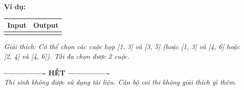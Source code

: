 \documentclass[11pt, a4paper]{article}
\newcommand{\iobox}[2]{
    \begin{center}
    \begin{tabularx}{0.8\textwidth}{|X|X|}
    \hline
    \textbf{Input} & \textbf{Output} \\
    \hline
    \vtop{#1} & \vtop{#2} \\
    \hline
    \end{tabularx}
    \end{center}
}
\begin{document}
\textbf{Ví dụ:}
\iobox{
4 \newline
1 3 \newline
2 4 \newline
3 5 \newline
4 6
}{
2
}
\textit{Giải thích: Có thể chọn các cuộc họp [1, 3] và [3, 5] (hoặc [1, 3] và [4, 6] hoặc [2, 4] và [4, 6]). Tối đa chọn được 2 cuộc.}

\vspace{1cm}
\begin{center}
    \textbf{---------------- HẾT ----------------} \\
    \textit{Thí sinh không được sử dụng tài liệu. Cán bộ coi thi không giải thích gì thêm.}
\end{center}
\end{document}
